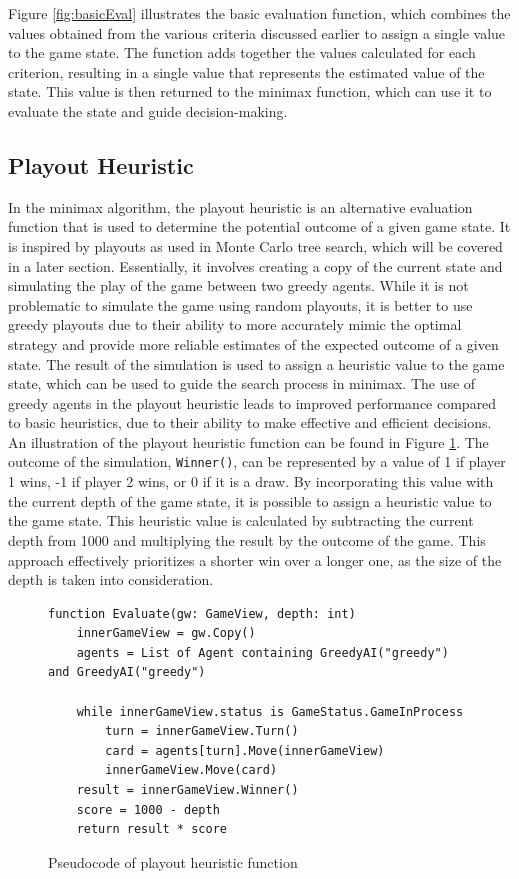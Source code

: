 Figure \ref{fig:basicEval} illustrates the basic evaluation function, which combines the values obtained from the various criteria discussed earlier to assign a single value to the game state. The function adds together the values calculated for each criterion, resulting in a single value that represents the estimated value of the state. This value is then returned to the minimax function, which can use it to evaluate the state and guide decision-making.

\subsection{Playout Heuristic}

In the minimax algorithm, the playout heuristic is an alternative evaluation function that is used to determine the potential outcome of a given game state. It is inspired by playouts as used in Monte Carlo tree search, which will be covered in a later section. Essentially, it involves creating a copy of the current state and simulating the play of the game between two greedy agents. While it is not problematic to simulate the game using random playouts, it is better to use greedy playouts due to their ability to more accurately mimic the optimal strategy and provide more reliable estimates of the expected outcome of a given state. The result of the simulation is used to assign a heuristic value to the game state, which can be used to guide the search process in minimax. The use of greedy agents in the playout heuristic leads to improved performance compared to basic heuristics, due to their ability to make effective and efficient decisions. An illustration of the playout heuristic function can be found in Figure \ref{fig:playoutEval}. The outcome of the simulation, \texttt{Winner()}, can be represented by a value of 1 if player 1 wins, -1 if player 2 wins, or 0 if it is a draw. By incorporating this value with the current depth of the game state, it is possible to assign a heuristic value to the game state. This heuristic value is calculated by subtracting the current depth from 1000 and multiplying the result by the outcome of the game. This approach effectively prioritizes a shorter win over a longer one, as the size of the depth is taken into consideration.

\begin{figure}[h]
\captionsetup{justification=centering}
\begin{lstlisting}
function Evaluate(gw: GameView, depth: int)
    innerGameView = gw.Copy()
    agents = List of Agent containing GreedyAI("greedy") and GreedyAI("greedy")

    while innerGameView.status is GameStatus.GameInProcess
        turn = innerGameView.Turn()
        card = agents[turn].Move(innerGameView)
        innerGameView.Move(card)
    result = innerGameView.Winner()
    score = 1000 - depth
    return result * score
\end{lstlisting}
\caption{Pseudocode of playout heuristic function}
\label{fig:playoutEval}
\end{figure}

